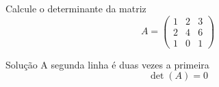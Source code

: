 \begin{question}
  Calcule o determinante da matriz
  \[
    A =
    \begin{pmatrix}
      1 & 2 & 3 \\
      2 & 4 & 6 \\
      1 & 0 & 1
    \end{pmatrix}
  \]
\end{question}

\begin{resolution}{Solução}
  A segunda linha é duas vezes a primeira
  \[
    \det(A) = 0
  \]
\end{resolution}

\endinput